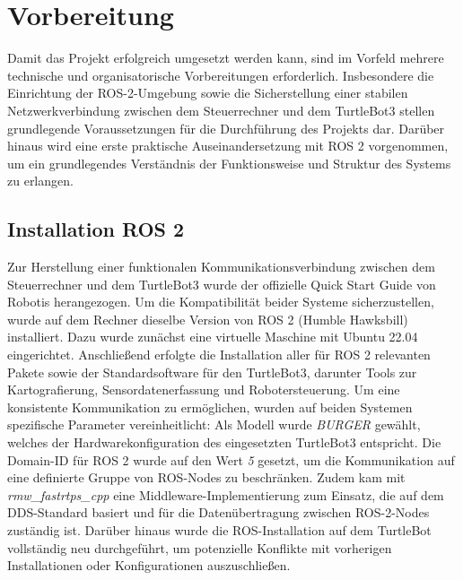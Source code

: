 \section{Vorbereitung}
Damit das Projekt erfolgreich umgesetzt werden kann, sind im Vorfeld mehrere technische und organisatorische Vorbereitungen erforderlich. 
Insbesondere die Einrichtung der ROS-2-Umgebung sowie die Sicherstellung einer stabilen Netzwerkverbindung zwischen dem Steuerrechner und dem TurtleBot3 stellen grundlegende Voraussetzungen für die Durchführung des Projekts dar. 
Darüber hinaus wird eine erste praktische Auseinandersetzung mit ROS 2 vorgenommen, um ein grundlegendes Verständnis der Funktionsweise und Struktur des Systems zu erlangen.
\subsection{Installation ROS 2}
Zur Herstellung einer funktionalen Kommunikationsverbindung zwischen dem Steuerrechner und dem TurtleBot3 wurde der offizielle Quick Start Guide \cite{tb3_quickstart} von Robotis herangezogen. 
Um die Kompatibilität beider Systeme sicherzustellen, wurde auf dem Rechner dieselbe Version von ROS 2 (Humble Hawksbill) installiert.
Dazu wurde zunächst eine virtuelle Maschine mit Ubuntu 22.04 eingerichtet. 
Anschließend erfolgte die Installation aller für ROS 2 relevanten Pakete sowie der Standardsoftware für den TurtleBot3, darunter Tools zur Kartografierung, Sen\-sor\-da\-ten\-er\-fass\-ung und Robotersteuerung.
\newPar
Um eine konsistente Kommunikation zu ermöglichen, wurden auf beiden Systemen spezifische Parameter vereinheitlicht: Als Modell wurde \textit{BURGER} gewählt, welches der Hardwarekonfiguration des eingesetzten TurtleBot3 entspricht. Die Domain-ID für ROS 2 wurde auf den Wert \textit{5} gesetzt, um die Kommunikation auf eine definierte Gruppe von ROS-Nodes zu beschränken. 
Zudem kam mit \textit{rmw\_fastrtps\_cpp} eine Middleware-Implementierung zum Einsatz, die auf dem DDS-Standard basiert und für die Datenübertragung zwischen ROS-2-Nodes zuständig ist.
\newPar
Darüber hinaus wurde die ROS-Installation auf dem TurtleBot vollständig neu durchgeführt, um potenzielle Konflikte mit vorherigen Installationen oder Konfigurationen auszuschließen.
